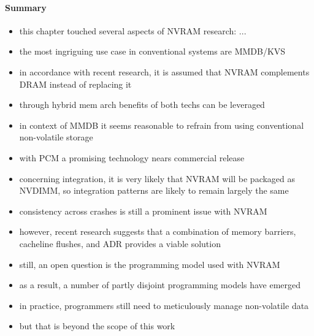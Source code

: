 
\paragraph{Summary}

\begin{itemize}
    \item this chapter touched several aspects of NVRAM research: ...
    \item the most ingriguing use case in conventional systems are MMDB/KVS
    \item in accordance with recent research, it is assumed that NVRAM complements DRAM instead of replacing it
    \item through hybrid mem arch benefits of both techs can be leveraged
    \item in context of MMDB it seems reasonable to refrain from using conventional non-volatile storage
    \item with PCM a promising technology nears commercial release
    \item concerning integration, it is very likely that NVRAM will be packaged as NVDIMM, so integration patterns are likely to remain largely the same
    \item consistency across crashes is still a prominent issue with NVRAM
    \item however, recent research suggests that a combination of memory barriers, cacheline flushes, and ADR provides a viable solution
    \item still, an open question is the programming model used with NVRAM
    \item as a result, a number of partly disjoint programming models have emerged
    \item in practice, programmers still need to meticulously manage non-volatile data
    \item but that is beyond the scope of this work
\end{itemize}
